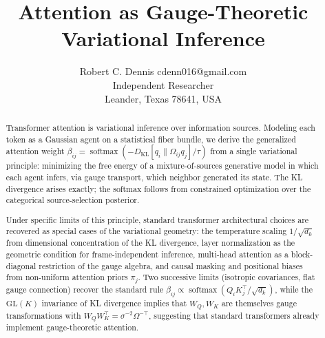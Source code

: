 \documentclass[twoside,11pt]{article}
\begin{document}

\title{Attention as Gauge-Theoretic Variational Inference}

\author{\name Robert C. Dennis \email cdenn016@gmail.com \\
       \addr Independent Researcher\\
       \addr Leander, Texas 78641, USA}


\maketitle

\begin{abstract}
Transformer attention is variational inference over information sources. Modeling each token as a Gaussian agent on a statistical fiber bundle, we derive the generalized attention weight $\beta_{ij} = \operatorname{softmax}(-D_{\mathrm{KL}}[q_i \| \Omega_{ij} q_j] / \tau)$ from a single variational principle: minimizing the free energy of a mixture-of-sources generative model in which each agent infers, via gauge transport, which neighbor generated its state. The KL divergence arises exactly; the softmax follows from constrained optimization over the categorical source-selection posterior.

Under specific limits of this principle, standard transformer architectural choices are recovered as special cases of the variational geometry: the temperature scaling $1/\sqrt{d_k}$ from dimensional concentration of the KL divergence, layer normalization as the geometric condition for frame-independent inference, multi-head attention as a block-diagonal restriction of the gauge algebra, and causal masking and positional biases from non-uniform attention priors $\pi_j$. Two successive limits (isotropic covariances, flat gauge connection) recover the standard rule $\beta_{ij} \propto \operatorname{softmax}(Q_i K_j^\top / \sqrt{d_k})$, while the $\mathrm{GL}(K)$ invariance of KL divergence implies that $W_Q, W_K$ are themselves gauge transformations with $W_Q W_K^\top = \sigma^{-2}\Omega^{-\top}$, suggesting that standard transformers already implement gauge-theoretic attention.


\end{abstract}
\end{document}
